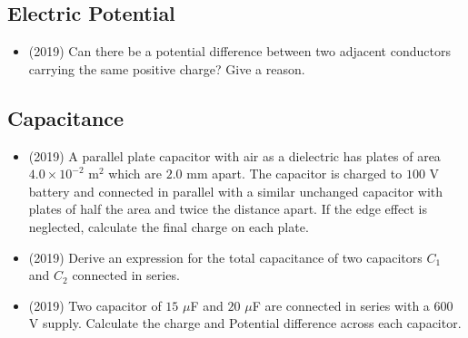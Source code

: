 \documentclass{article}
\begin{document}
\subsection{Electric Potential}
\begin{itemize}
\item (2019)  Can there be a potential difference between two adjacent conductors carrying the same positive charge? Give a reason. 
\end{itemize}

\subsection{Capacitance}
\begin{itemize}
\item (2019)  A parallel plate capacitor with air as a dielectric has plates of area $ 4.0 \times 10^{-2}$ m$ ^{2}$ which are $ 2.0$ mm apart. The capacitor is charged to $ 100$ V battery and connected in parallel with a similar unchanged capacitor with plates of half the area and twice the distance apart. If the edge effect is neglected, calculate the final charge on each plate. 
\item (2019)  Derive an expression for the total capacitance of two capacitors $ C_{1}$ and $ C_{2}$ connected in series. 
\item (2019)  Two capacitor of $ 15$ $\mu$F and $ 20$ $\mu$F are connected in series with a $ 600$ V supply.  Calculate the charge and Potential difference across each capacitor. 
\end{itemize}
\end{document}
